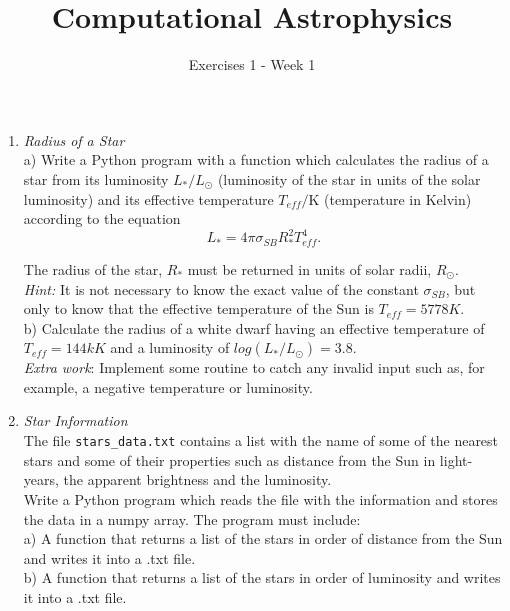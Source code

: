 \documentclass[10pt,letterpaper,notitlepage]{report}
\begin{document}
\title{Computational Astrophysics}
\author{Exercises 1 - Week 1}
\maketitle

\begin{enumerate}
\item  \textit{Radius of a Star} \\
a) Write a Python program with a function which calculates the radius of a star from its luminosity $L_{*} / L_{\odot}$ (luminosity of the star in units of the solar luminosity) and its effective temperature $T_{eff} / \textrm{K}$ (temperature in Kelvin) according to the equation
\begin{equation}
L_{*} = 4 \pi \sigma_{SB} R_{*}^2 T_{eff}^4 .
\end{equation}

The radius of the star, $R_{*}$ must be returned in units of solar radii, $R_{\odot}$.\\
\textit{Hint:} It is not necessary to know the exact value of the constant $\sigma_{SB}$, but only to know that the effective temperature of the Sun is
$T_{eff} = 5778 K$. \\

b) Calculate the radius of a white dwarf having an effective temperature of $T_{eff} = 144 kK$ and a luminosity of $log(L_{*} /L_{\odot}) = 3.8$. \\

\textit{Extra work}: Implement some routine to catch any invalid input such as, for example, a negative temperature or luminosity.


\item \textit{Star Information}\\

The file \verb$stars_data.txt$ contains a list with the name of some of the nearest stars and some of their properties such as distance from the Sun in light-years, the apparent brightness and the luminosity. \\
Write a Python program which reads the file with the information and stores the data in a numpy array. The program must include:\\

a) A function that returns a list of the stars in order of distance from the Sun and writes it into a .txt file.\\

b) A function that returns a list of the stars in order of luminosity and writes it into a .txt file.




\end{enumerate}
\end{document}
